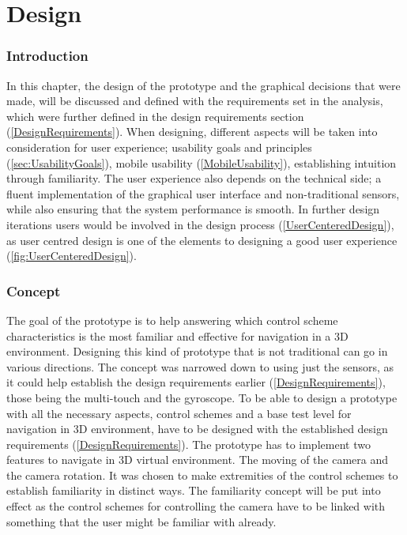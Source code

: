 \chapter{Design}
\subsection{Introduction}
In this chapter, the design of the prototype and the graphical decisions that were made, will be discussed and defined with the requirements set in the analysis, which were further defined in the design requirements section (\ref{DesignRequirements}). When designing, different aspects will be taken into consideration for user experience; usability goals and principles (\ref{sec:UsabilityGoals}), mobile usability (\ref{MobileUsability}), establishing intuition through familiarity. The user experience also depends on the technical side; a fluent implementation of the graphical user interface and non-traditional sensors, while also ensuring that the system performance is smooth. In further design iterations users would be involved in the design process (\ref{UserCenteredDesign}), as user centred design is one of the elements to designing a good user experience (\ref{fig:UserCenteredDesign}).

\subsection{Concept}
The goal of the prototype is to help answering which control scheme characteristics is the most familiar and effective for navigation in a 3D environment. Designing this kind of prototype that is not traditional can go in various directions. The concept was narrowed down to using just the sensors, as it could help establish the design requirements earlier (\ref{DesignRequirements}), those being the multi-touch and the gyroscope.
To be able to design a prototype with all the necessary aspects, control schemes and a base test level for navigation in 3D environment, have to be designed with the established design requirements (\ref{DesignRequirements}).
The prototype has to implement two features to navigate in 3D virtual environment. The moving of the camera and the camera rotation. It was chosen to make extremities of the control schemes to establish familiarity in distinct ways. The familiarity concept will be put into effect as the control schemes for controlling the camera have to be linked with something that the user might be familiar with already. 

